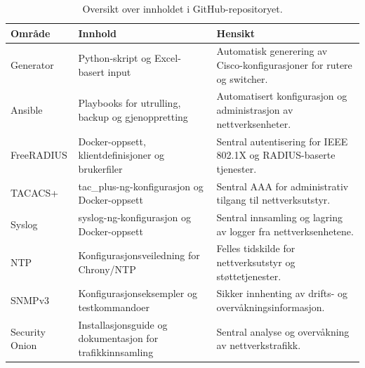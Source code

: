 \begin{table}[H]
    \centering
    \caption{Oversikt over innholdet i GitHub-repositoryet.}
    \label{tab:github-innhold}
    \small
    \renewcommand{\arraystretch}{1.35}
    \setlength{\tabcolsep}{5pt}

    \begin{tabular}{
        >{\raggedright\arraybackslash}p{3.2cm}
        >{\raggedright\arraybackslash}p{5.2cm}
        >{\raggedright\arraybackslash}p{6.0cm}
    }
        \toprule
        \rowcolor{tablegreen}
        \color{white}\textbf{Område} &
        \color{white}\textbf{Innhold} &
        \color{white}\textbf{Hensikt} \\
        \midrule

        Generator &
        Python-skript og Excel-basert input &
        Automatisk generering av Cisco-konfigurasjoner for rutere og switcher. \\

        Ansible &
        Playbooks for utrulling, backup og gjenoppretting &
        Automatisert konfigurasjon og administrasjon av nettverksenheter. \\

        FreeRADIUS &
        Docker-oppsett, klientdefinisjoner og brukerfiler &
        Sentral autentisering for IEEE 802.1X og RADIUS-baserte tjenester. \\

        TACACS+ &
        tac\_plus-ng-konfigurasjon og Docker-oppsett &
        Sentral AAA for administrativ tilgang til nettverksutstyr. \\

        Syslog &
        syslog-ng-konfigurasjon og Docker-oppsett &
        Sentral innsamling og lagring av logger fra nettverksenhetene. \\

        NTP &
        Konfigurasjonsveiledning for Chrony/NTP &
        Felles tidskilde for nettverksutstyr og støttetjenester. \\

        SNMPv3 &
        Konfigurasjonseksempler og testkommandoer &
        Sikker innhenting av drifts- og overvåkningsinformasjon. \\

        Security Onion &
        Installasjonsguide og dokumentasjon for trafikkinnsamling &
        Sentral analyse og overvåkning av nettverkstrafikk. \\


\end{tabular}
\end{table}
